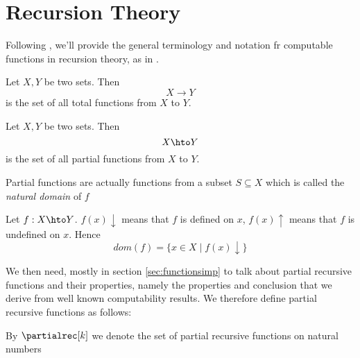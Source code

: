 \section{Recursion Theory}

Following \cite{ranzato:analysis}, we'll provide the general
terminology and notation fr computable functions in recursion theory,
as in
\cite{cutland1980computability,odifreddi1992classical,rogers1987theory}.

\begin{definition}
  Let \(X,Y\) be two sets. Then \[X \to Y\] is the set of all total
  functions from \(X\) to \(Y\).
\end{definition}

\begin{definition}
  Let \(X,Y\) be two sets. Then \[X \hto Y\] is the set of all partial
  functions from \(X\) to \(Y\).
\end{definition}
\noindent

Partial functions are actually functions from a subset
\(S \subseteq X\) which is called the \emph{natural domain} of \(f\)

\begin{definition}
  Let \(f : X \hto Y\). \(f(x)\downarrow\) means that \(f\) is defined
  on \(x\), \(f(x)\uparrow\) means that \(f\) is undefined on
  \(x\). Hence \[dom(f) = \{x \in X \mid f(x)\downarrow\}\]
\end{definition}



We then need, mostly in section \ref{sec:functionsimp} to talk about
partial recursive functions and their properties, namely the
properties and conclusion that we derive from well known computability
results. We therefore define partial recursive functions as follows:

\begin{notation}\label{bg:partialrec}
  By \(\partialrec[k]\) we denote the set of partial recursive
  functions on natural numbers
\end{notation}

